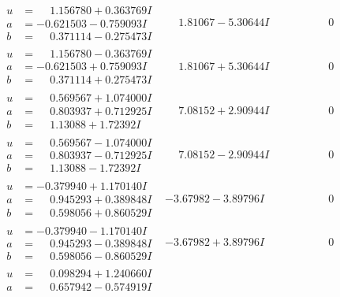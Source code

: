 \documentclass[1p]{elsarticle_modified}
\theoremstyle{definition}
\begin{document}
$$\begin{array}{c|c|c}
\begin{aligned}
u &= \phantom{-}1.156780 + 0.363769 I \\
a &= -0.621503 - 0.759093 I \\
b &= \phantom{-}0.371114 - 0.275473 I\end{aligned}
 & \phantom{-}1.81067 - 5.30644 I & \phantom{-0.000000 } 0 \\ \hline\begin{aligned}
u &= \phantom{-}1.156780 - 0.363769 I \\
a &= -0.621503 + 0.759093 I \\
b &= \phantom{-}0.371114 + 0.275473 I\end{aligned}
 & \phantom{-}1.81067 + 5.30644 I & \phantom{-0.000000 } 0 \\ \hline\begin{aligned}
u &= \phantom{-}0.569567 + 1.074000 I \\
a &= \phantom{-}0.803937 + 0.712925 I \\
b &= \phantom{-}1.13088 + 1.72392 I\end{aligned}
 & \phantom{-}7.08152 + 2.90944 I & \phantom{-0.000000 } 0 \\ \hline\begin{aligned}
u &= \phantom{-}0.569567 - 1.074000 I \\
a &= \phantom{-}0.803937 - 0.712925 I \\
b &= \phantom{-}1.13088 - 1.72392 I\end{aligned}
 & \phantom{-}7.08152 - 2.90944 I & \phantom{-0.000000 } 0 \\ \hline\begin{aligned}
u &= -0.379940 + 1.170140 I \\
a &= \phantom{-}0.945293 + 0.389848 I \\
b &= \phantom{-}0.598056 + 0.860529 I\end{aligned}
 & -3.67982 - 3.89796 I & \phantom{-0.000000 } 0 \\ \hline\begin{aligned}
u &= -0.379940 - 1.170140 I \\
a &= \phantom{-}0.945293 - 0.389848 I \\
b &= \phantom{-}0.598056 - 0.860529 I\end{aligned}
 & -3.67982 + 3.89796 I & \phantom{-0.000000 } 0 \\ \hline\begin{aligned}
u &= \phantom{-}0.098294 + 1.240660 I \\
a &= \phantom{-}0.657942 - 0.574919 I \\

\end{aligned}
\end{array}$$
\end{document}
